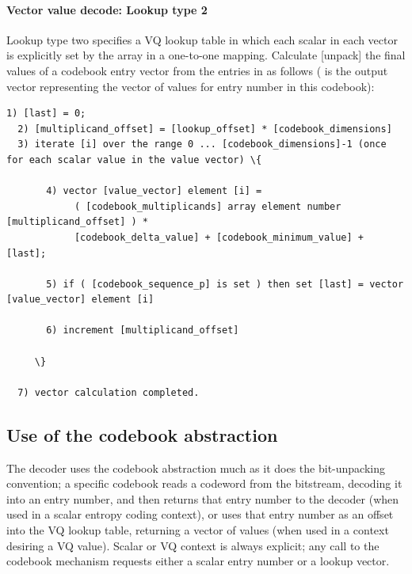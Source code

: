 \paragraph{Vector value decode: Lookup type 2}

Lookup type two specifies a VQ lookup table in which each scalar in
each vector is explicitly set by the 
array in a one-to-one mapping.  Calculate [unpack] the
final values of a codebook entry vector from the entries in
 as follows (
is the output vector representing the vector of values for entry number
 in this codebook):

\begin{Verbatim}[commandchars=\\\{\}]
  1) [last] = 0;
  2) [multiplicand_offset] = [lookup_offset] * [codebook_dimensions]
  3) iterate [i] over the range 0 ... [codebook_dimensions]-1 (once for each scalar value in the value vector) \{

       4) vector [value_vector] element [i] =
            ( [codebook_multiplicands] array element number [multiplicand_offset] ) *
            [codebook_delta_value] + [codebook_minimum_value] + [last];

       5) if ( [codebook_sequence_p] is set ) then set [last] = vector [value_vector] element [i]

       6) increment [multiplicand_offset]

     \}

  7) vector calculation completed.
\end{Verbatim}









\subsection{Use of the codebook abstraction}

The decoder uses the codebook abstraction much as it does the
bit-unpacking convention; a specific codebook reads a
codeword from the bitstream, decoding it into an entry number, and then
returns that entry number to the decoder (when used in a scalar
entropy coding context), or uses that entry number as an offset into
the VQ lookup table, returning a vector of values (when used in a context
desiring a VQ value). Scalar or VQ context is always explicit; any call
to the codebook mechanism requests either a scalar entry number or a
lookup vector.

